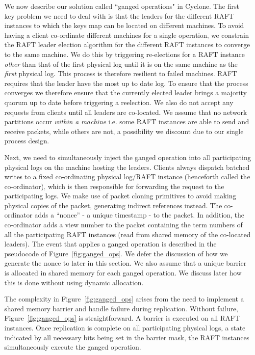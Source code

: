 \documentclass[letterpaper,twocolumn,10pt]{article}
\begin{document}
We now describe our solution called ``ganged operations" in Cyclone. 
The first key problem we need to deal with is that the leaders for the different
RAFT instances to which the keys map can be located on different machines. To
avoid having a client co-ordinate different machines for a single operation, we
constrain the RAFT leader election algorithm for the different RAFT instances to
converge to the same machine. We do this by triggering re-elections for a RAFT
instance \emph{other} than that of the first physical log until it is on the same
machine as the \emph{first} physical log. This process is therefore resilient to
failed machines. RAFT requires that the leader have the most up to date log. To
ensure that the process converges we therefore ensure that the currently elected
leader brings a majority quorum up to date before triggering a reelection. We
also do not accept any requests from clients until all leaders are
co-located. We assume that no network partitions occur \emph{within a machine}
i.e. some RAFT instances are able to send and receive packets, while others are
not, a possibility we discount due to our single process design.

Next, we need to simultaneously inject the ganged operation into all
participating physical logs on the machine hosting the leaders. Clients always
dispatch batched writes to a fixed co-ordinating physical log/RAFT instance
(henceforth called the co-ordinator), which is then responsible for forwarding
the request to the participating logs. We make use of packet cloning primitives
to avoid making physical copies of the packet, generating indirect references
instead. The co-ordinator adds a ``nonce'' - a unique timestamp - to the
packet. In addition, the co-ordinator adds a view number to the packet
containing the term numbers of all the participating RAFT instances (read from
shared memory of the co-located leaders).  The event that applies a ganged
operation is described in the pseudocode of Figure~\ref{fig:ganged_ops}. We
defer the discussion of how we generate the nonce to later in this section. We
also assume that a unique barrier is allocated in shared memory for each ganged
operation. We discuss later how this is done without using dynamic allocation.

The complexity in Figure~\ref{fig:ganged_ops} arises from the need to implement
a shared memory barrier and handle failure during replication. Without failure,
Figure~\ref{fig:ganged_ops} is straightforward. A barrier is executed on all
RAFT instances. Once replication is complete on all participating physical logs,
a state indicated by all necessary bits being set in the barrier mask, the RAFT
instances simultaneously execute the ganged operation.
\end{document}
